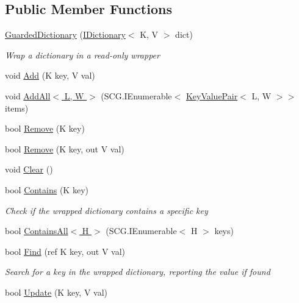 \subsection*{Public Member Functions}
\begin{DoxyCompactItemize}
\item 
\hyperlink{class_c5_1_1_guarded_dictionary_aede5f0b863aa1b9e73aaefc75b07406b}{Guarded\+Dictionary} (\hyperlink{interface_c5_1_1_i_dictionary}{I\+Dictionary}$<$ K, V $>$ dict)
\begin{DoxyCompactList}\small\item\em Wrap a dictionary in a read-\/only wrapper \end{DoxyCompactList}\item 
void \hyperlink{class_c5_1_1_guarded_dictionary_a353f8b07283f31fb34456317bdb9cf43}{Add} (K key, V val)
\item 
void \hyperlink{class_c5_1_1_guarded_dictionary_a992dd8a21a6a6146fc937d0975ee1c8a}{Add\+All$<$ L, W $>$} (S\+C\+G.\+I\+Enumerable$<$ \hyperlink{struct_c5_1_1_key_value_pair}{Key\+Value\+Pair}$<$ L, W $>$$>$ items)
\item 
bool \hyperlink{class_c5_1_1_guarded_dictionary_a80c9ecc7aa9664fbcd7e292bda4342bc}{Remove} (K key)
\item 
bool \hyperlink{class_c5_1_1_guarded_dictionary_a854f4f5d586a5712b4b96268ac63950b}{Remove} (K key, out V val)
\item 
void \hyperlink{class_c5_1_1_guarded_dictionary_ac5f23f523e9eae132f4e465eb004be0a}{Clear} ()
\item 
bool \hyperlink{class_c5_1_1_guarded_dictionary_a16126875960f6459a2d697131755128c}{Contains} (K key)
\begin{DoxyCompactList}\small\item\em Check if the wrapped dictionary contains a specific key \end{DoxyCompactList}\item 
bool \hyperlink{class_c5_1_1_guarded_dictionary_aba0b4712e17daaba4b81245cc6958862}{Contains\+All$<$ H $>$} (S\+C\+G.\+I\+Enumerable$<$ H $>$ keys)
\item 
bool \hyperlink{class_c5_1_1_guarded_dictionary_af7eef747a8e733e4167c1a9ea4954274}{Find} (ref K key, out V val)
\begin{DoxyCompactList}\small\item\em Search for a key in the wrapped dictionary, reporting the value if found \end{DoxyCompactList}\item 
bool \hyperlink{class_c5_1_1_guarded_dictionary_a128b6b9f09658c7cd687248592197669}{Update} (K key, V val)
$$
\end{DoxyCompactItemize}
